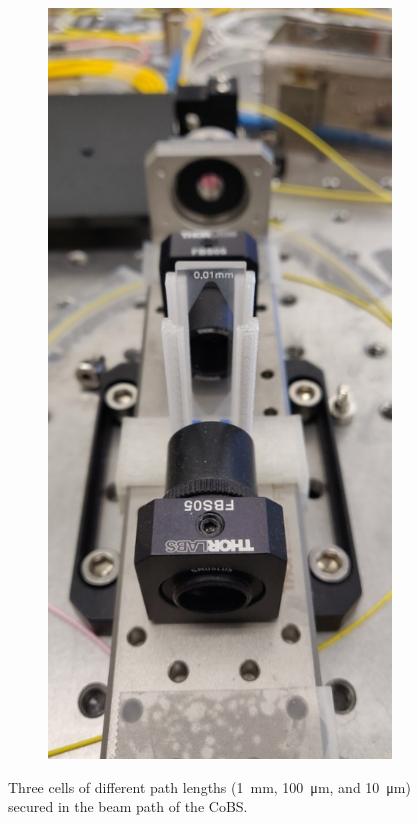 \begin{figure}[t]
\begin{subfigure}[b]{0.3\textwidth}
        \label{fig:Raman:100umCS2pic}
    \end{subfigure}
    \hfill
    \begin{subfigure}[b]{0.3\textwidth}
        \centering
        \includegraphics[width=\textwidth]{figs/4-Raman/10umCS2.jpg}
        \label{fig:Raman:10umCS2pic}
    \end{subfigure}
    \caption{Three  cells of different path lengths (\SI{1}{\milli\meter}, \SI{100}{\micro\meter}, and \SI{10}{\micro\meter}) secured in the beam path of the \acl{CoBS}.}
    \label{fig:Raman:CS2Comparison}
\end{figure}

